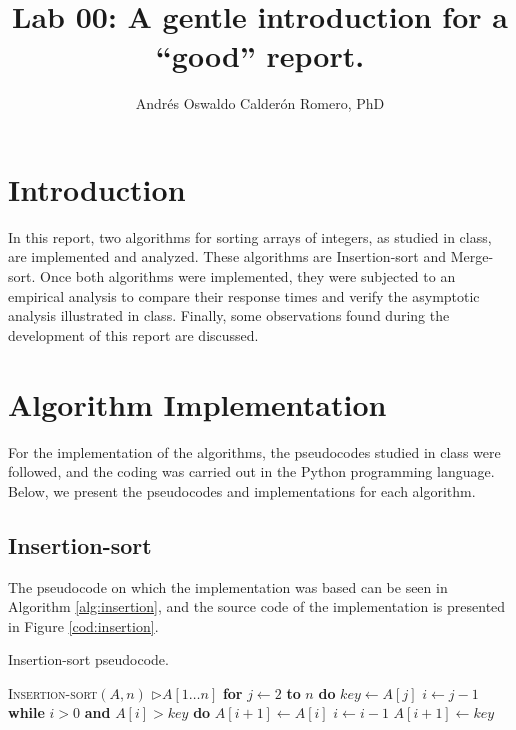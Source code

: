 \documentclass[11pt]{article}
\title{Lab 00: A gentle introduction for a ``good'' report.}
\author{Andrés Oswaldo Calderón Romero, PhD}
\begin{document}
\maketitle

\section{Introduction}
In this report, two algorithms for sorting arrays of integers, as studied in class, are implemented and analyzed. These algorithms are Insertion-sort and Merge-sort. Once both algorithms were implemented, they were subjected to an empirical analysis to compare their response times and verify the asymptotic analysis illustrated in class. Finally, some observations found during the development of this report are discussed.

\section{Algorithm Implementation}
For the implementation of the algorithms, the pseudocodes studied in class were followed, and the coding was carried out in the Python programming language. Below, we present the pseudocodes and implementations for each algorithm.

\subsection{Insertion-sort}
The pseudocode on which the implementation was based can be seen in Algorithm \ref{alg:insertion}, and the source code of the implementation is presented in Figure \ref{cod:insertion}.

\begin{algorithm}
    \caption{Insertion-sort pseudocode.}
    \begin{algorithmic}[1]
        \STATE \textsc{Insertion-sort}$(A, n)$ \hspace{5mm} $\rhd A[1 \ldots n]$
        \STATE \hspace{1em} \textbf{for} $j \leftarrow 2$ \textbf{to} $n$ \textbf{do}
        \STATE \hspace{2em} $key \leftarrow A[j]$
        \STATE \hspace{2em} $i \leftarrow j - 1$
        \STATE \hspace{2em} \textbf{while} $i > 0$ \textbf{and} $A[i] > key$ \textbf{do}
        \STATE \hspace{3em} $A[i + 1] \leftarrow A[i]$
        \STATE \hspace{3em} $i \leftarrow i - 1$
        \STATE \hspace{2em} $A[i + 1] \leftarrow key$
    \end{algorithmic}
    \label{alg:insertion}
\end{algorithm}
\end{document}
